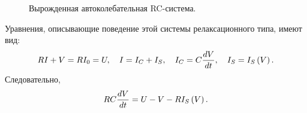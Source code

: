 \begin{figure}[h]
	\begin{minipage}[h]{0.49\linewidth}
	\end{minipage}
	\hfill
	\begin{minipage}[h]{0.49\linewidth}
	\end{minipage}
	\caption{Вырожденная автоколебательная RC-система.}
\end{figure}

Уравнения, описывающие поведение этой системы релаксационного типа,
имеют вид:
\begin{equation}
	\eqmark{auto-4}
	RI+V=RI_0=U,\quad I=I_C+I_S,\quad I_C=C\frac{dV}{dt},\quad I_S=I_S\left( V \right).
\end{equation}
Следовательно,
\begin{equation}
	\eqmark{auto-5}
	RC\frac{dV}{dt}=U-V-R{{I}_{S}}\left( V \right).
\end{equation}

